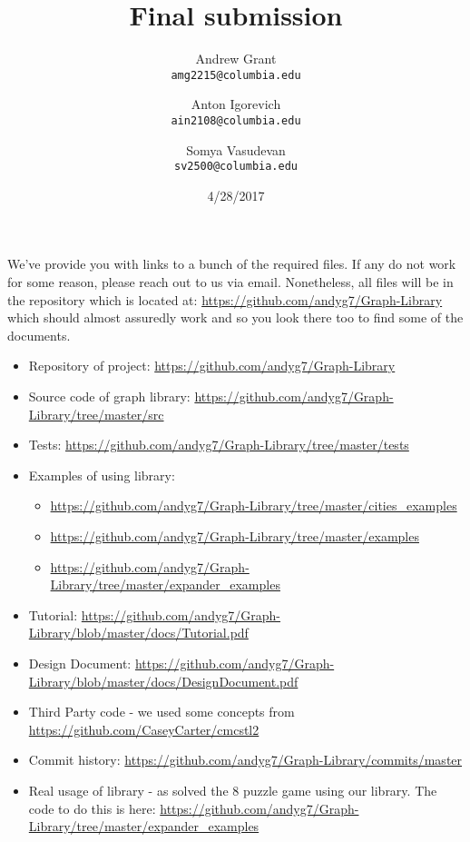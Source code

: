 \documentclass{article}
\title{Final submission}
\author{
Andrew Grant\\
\texttt{amg2215@columbia.edu}
\and 
Anton Igorevich \\
\texttt{ain2108@columbia.edu}
\and
 Somya Vasudevan \\
 \texttt{sv2500@columbia.edu}
}
\date{4/28/2017}
\begin{document}
\maketitle

\section{}
We've provide you with links to a bunch of the required files. If any do not work for some reason, please reach out to us via email. Nonetheless, all files will be in the repository which is located at:  \url{https://github.com/andyg7/Graph-Library} which should almost assuredly work and so you look there too to find some of the documents.
\begin{itemize}
\item Repository of project: \url{https://github.com/andyg7/Graph-Library}
\item Source code of graph library: \url{https://github.com/andyg7/Graph-Library/tree/master/src}
\item Tests: \url{https://github.com/andyg7/Graph-Library/tree/master/tests}
\item Examples of using library:
\begin{itemize}
\item \url{https://github.com/andyg7/Graph-Library/tree/master/cities_examples}
\item \url{https://github.com/andyg7/Graph-Library/tree/master/examples}
\item \url{https://github.com/andyg7/Graph-Library/tree/master/expander_examples}
\end{itemize}
\item Tutorial: \url{https://github.com/andyg7/Graph-Library/blob/master/docs/Tutorial.pdf}
\item Design Document: \url{https://github.com/andyg7/Graph-Library/blob/master/docs/DesignDocument.pdf}
\item Third Party code - we used some concepts from \url{https://github.com/CaseyCarter/cmcstl2}
\item Commit history: \url{https://github.com/andyg7/Graph-Library/commits/master}
\item Real usage of library - as solved the 8 puzzle game using our library. The code to do this is here:  \url{https://github.com/andyg7/Graph-Library/tree/master/expander_examples}
\end{itemize}
\end{document}
